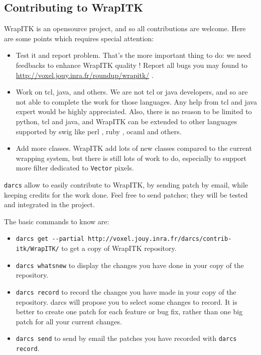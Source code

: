 \documentclass{InsightArticle}
\begin{document}
  \subsection{Contributing to WrapITK}

WrapITK is an opensource project, and so all contributions are welcome. Here are
some points which requires special attention:
\begin{itemize}
  \item Test it and report problem. That's the more important thing to do:
we need feedbacks to enhance WrapITK quality ! Report all bugs you may found
to \url{http://voxel.jouy.inra.fr/roundup/wrapitk/} \cite{RoundupWebSite}.
  \item Work on tcl, java, and others. We are not tcl or java developers, and so
are not able to complete the work for those languages. Any help from tcl and
java expert would be highly appreciated. Also, there is no reason to be limited
to python, tcl and java, and WrapITK can be extended to other languages supported
by swig like perl \cite{PerlWebSite}, ruby \cite{RubyWebSite}, ocaml \cite{OcamlWebSite} and others.
  \item Add more classes. WrapITK add lots of new classes compared to the current
wrapping system, but there is still lots of work to do, especially to support more
filter dedicated to \verb$Vector$ pixels.
\end{itemize}

\verb$darcs$ \cite{DarcsWebSite} allow to easily contribute to WrapITK, by sending
patch by email, while keeping credits for the work done.
Feel free to send patches; they will be tested and integrated in the project.

The basic commands to know are:
\begin{itemize}

  \item \verb$darcs get --partial http://voxel.jouy.inra.fr/darcs/contrib-itk/WrapITK/$
to get a copy of WrapITK repository.

  \item \verb$darcs whatsnew$ to display the changes you have done in
your copy of the repository.

  \item \verb$darcs record$ to record the changes you have made in your
copy of the repository. darcs will propose you to select some changes
to record. It is better to create one patch for each feature or bug
fix, rather than one big patch for all your current changes.

  \item \verb$darcs send$ to send by email the patches you have recorded with
\verb$darcs record$.

\end{itemize}
\end{document}
